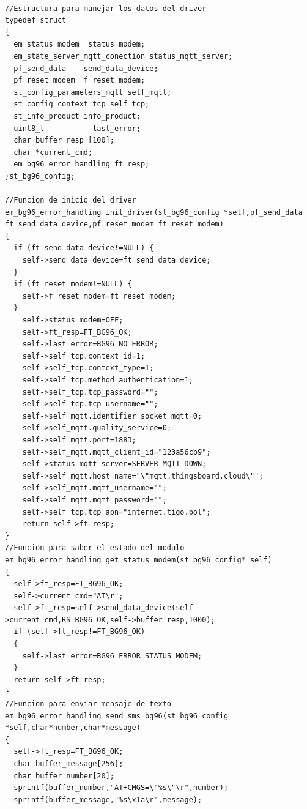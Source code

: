 \begin{lstlisting}[label=cod:driver bg96,caption=Funciones principales del driver del sensor AHT10.]  % Start your code-block

//Estructura para manejar los datos del driver 
typedef struct 
{
  em_status_modem  status_modem;
  em_state_server_mqtt_conection status_mqtt_server;
  pf_send_data    send_data_device;
  pf_reset_modem  f_reset_modem; 
  st_config_parameters_mqtt self_mqtt;
  st_config_context_tcp self_tcp;
  st_info_product info_product;
  uint8_t           last_error;
  char buffer_resp [100];
  char *current_cmd;
  em_bg96_error_handling ft_resp;
}st_bg96_config;

//Funcion de inicio del driver 
em_bg96_error_handling init_driver(st_bg96_config *self,pf_send_data ft_send_data_device,pf_reset_modem ft_reset_modem)
{
  if (ft_send_data_device!=NULL) {
    self->send_data_device=ft_send_data_device;
  }
  if (ft_reset_modem!=NULL) {
    self->f_reset_modem=ft_reset_modem;
  }
    self->status_modem=OFF;
    self->ft_resp=FT_BG96_OK;
    self->last_error=BG96_NO_ERROR;
    self->self_tcp.context_id=1;
    self->self_tcp.context_type=1;
    self->self_tcp.method_authentication=1;
    self->self_tcp.tcp_password="";
    self->self_tcp.tcp_username="";
    self->self_mqtt.identifier_socket_mqtt=0;
    self->self_mqtt.quality_service=0;
    self->self_mqtt.port=1883;
    self->self_mqtt.mqtt_client_id="123a56cb9";
    self->status_mqtt_server=SERVER_MQTT_DOWN;
    self->self_mqtt.host_name="\"mqtt.thingsboard.cloud\"";
    self->self_mqtt.mqtt_username="";
    self->self_mqtt.mqtt_password="";
    self->self_tcp.tcp_apn="internet.tigo.bol";
    return self->ft_resp;
}
//Funcion para saber el estado del modulo
em_bg96_error_handling get_status_modem(st_bg96_config* self)
{
  self->ft_resp=FT_BG96_OK;
  self->current_cmd="AT\r";
  self->ft_resp=self->send_data_device(self->current_cmd,RS_BG96_OK,self->buffer_resp,1000);
  if (self->ft_resp!=FT_BG96_OK)
  {
    self->last_error=BG96_ERROR_STATUS_MODEM;
  }
  return self->ft_resp;
}
//Funcion para enviar mensaje de texto 
em_bg96_error_handling send_sms_bg96(st_bg96_config *self,char*number,char*message)
{
  self->ft_resp=FT_BG96_OK;
  char buffer_message[256];
  char buffer_number[20];
  sprintf(buffer_number,"AT+CMGS=\"%s\"\r",number);
  sprintf(buffer_message,"%s\x1a\r",message);
  

\end{lstlisting}
